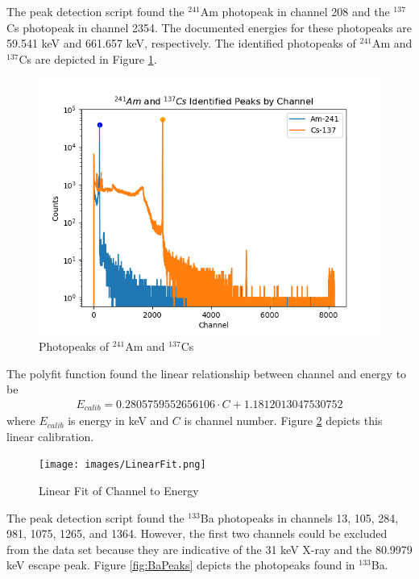 The peak detection script found the $^{241}$Am photopeak in channel 208 and the $^{137}$Cs photopeak in channel 2354. The documented energies for these photopeaks are 59.541 keV  and 661.657 keV, respectively. The identified photopeaks of $^{241}$Am and $^{137}$Cs are depicted in Figure \ref{fig:Peaks}.

\begin{figure}[H]
\centering
\includegraphics[scale=0.8]{images/Peaks.png}
\caption{Photopeaks of $^{241}$Am and $^{137}$Cs}
\label{fig:Peaks}
\end{figure}

The polyfit function found the linear relationship between channel and energy to be
\begin{align}
E_{calib} = 0.2805759552656106\cdot C + 1.1812013047530752 \label{eq:1}
\end{align}
where $E_{calib}$ is energy in keV and $C$ is channel number. Figure \ref{fig:Fit} depicts this linear calibration.

\begin{figure}[H]
\centering
\texttt{[image: images/LinearFit.png]}
\caption{Linear Fit of Channel to Energy}
\label{fig:Fit}
\end{figure}

The peak detection script found the $^{133}$Ba photopeaks in channels 13, 105, 284, 981, 1075, 1265, and 1364. However, the first two channels could be excluded from the data set because they are indicative of the 31 keV X-ray and the 80.9979 keV escape peak. Figure \ref{fig:BaPeaks} depicts the photopeaks found in $^{133}$Ba.

